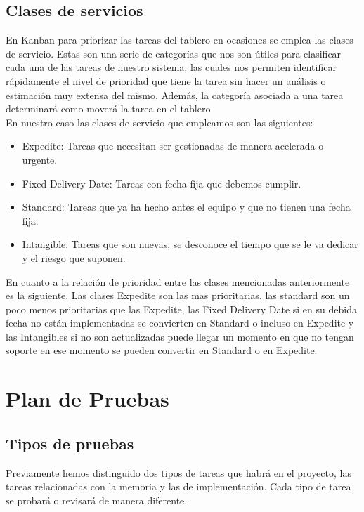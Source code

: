 \subsection{Clases de servicios}
En Kanban para priorizar las tareas del tablero en ocasiones se emplea las clases de servicio. Estas son una serie de categorías que nos son útiles para clasificar cada una de las tareas de nuestro sistema, las cuales nos permiten identificar rápidamente el nivel de prioridad que tiene la tarea sin hacer un análisis o estimación muy extensa del mismo. Además, la categoría asociada a una tarea determinará como moverá la tarea en el tablero.\\
En nuestro caso las clases de servicio que empleamos son las siguientes:
\begin{itemize}
    \item Expedite: Tareas que necesitan ser gestionadas de manera acelerada o urgente.
    \item Fixed Delivery Date: Tareas con fecha fija que debemos cumplir.
    \item Standard: Tareas que ya ha hecho antes el equipo y que no tienen una fecha fija.
    \item Intangible: Tareas que son nuevas, se desconoce el tiempo que se le va dedicar y el riesgo que suponen.
\end{itemize}
En cuanto a la relación de prioridad entre las clases mencionadas anteriormente es la siguiente. Las clases Expedite son las mas prioritarias, las standard son un poco menos prioritarias que las Expedite, las Fixed Delivery Date si en su debida fecha no están implementadas se convierten en Standard o incluso en Expedite y las Intangibles si no son actualizadas puede llegar un momento en que no tengan soporte en ese momento se pueden convertir en Standard o en Expedite.



\section{Plan de Pruebas}
\nocite{pipelineRedHat}
\nocite{testingSW}
\nocite{ciAmazon}
\subsection{Tipos de pruebas}
Previamente hemos distinguido dos tipos de tareas que habrá en el proyecto, las tareas relacionadas con la memoria y las de implementación. Cada tipo de tarea se probará o revisará de manera diferente.

